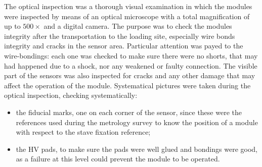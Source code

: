 The optical inspection was a thorough visual examination in which the modules were inspected by means of an optical microscope with a total magnification of up to $500\times$ and a digital camera.
The purpose was to check the modules integrity after the transportation to the loading site, especially wire bonds integrity and cracks in the sensor area.
Particular attention was payed to the wire-bondings: each one was checked to make sure there were no shorts, that may had happened due to a shock, nor any weakened or faulty connection. The visible part of the sensors was also inspected for cracks and any other damage that may affect the operation of the module. 
Systematical pictures were taken during the optical inspection, checking systematically:
\begin{itemize}
	\item the fiducial marks, one on each corner of the sensor, since these were the references used during the metrology survey to know the position of a module with respect to the stave fixation reference;
	\item the HV pads, to make sure the pads were well glued and bondings were good, as a failure at this level could prevent the module to be operated.
\end{itemize}

%

